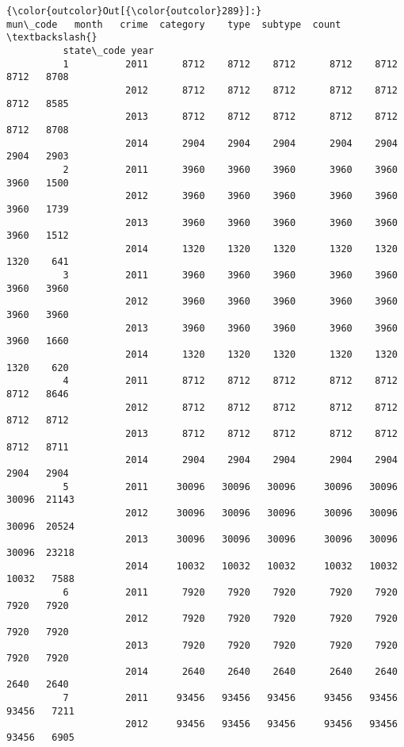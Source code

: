 \documentclass[11pt]{article}
\begin{document}
\begin{Verbatim}[commandchars=\\\{\}]
{\color{outcolor}Out[{\color{outcolor}289}]:}                  mun\_code   month   crime  category    type  subtype  count  \textbackslash{}
          state\_code year                                                               
          1          2011      8712    8712    8712      8712    8712     8712   8708   
                     2012      8712    8712    8712      8712    8712     8712   8585   
                     2013      8712    8712    8712      8712    8712     8712   8708   
                     2014      2904    2904    2904      2904    2904     2904   2903   
          2          2011      3960    3960    3960      3960    3960     3960   1500   
                     2012      3960    3960    3960      3960    3960     3960   1739   
                     2013      3960    3960    3960      3960    3960     3960   1512   
                     2014      1320    1320    1320      1320    1320     1320    641   
          3          2011      3960    3960    3960      3960    3960     3960   3960   
                     2012      3960    3960    3960      3960    3960     3960   3960   
                     2013      3960    3960    3960      3960    3960     3960   1660   
                     2014      1320    1320    1320      1320    1320     1320    620   
          4          2011      8712    8712    8712      8712    8712     8712   8646   
                     2012      8712    8712    8712      8712    8712     8712   8712   
                     2013      8712    8712    8712      8712    8712     8712   8711   
                     2014      2904    2904    2904      2904    2904     2904   2904   
          5          2011     30096   30096   30096     30096   30096    30096  21143   
                     2012     30096   30096   30096     30096   30096    30096  20524   
                     2013     30096   30096   30096     30096   30096    30096  23218   
                     2014     10032   10032   10032     10032   10032    10032   7588   
          6          2011      7920    7920    7920      7920    7920     7920   7920   
                     2012      7920    7920    7920      7920    7920     7920   7920   
                     2013      7920    7920    7920      7920    7920     7920   7920   
                     2014      2640    2640    2640      2640    2640     2640   2640   
          7          2011     93456   93456   93456     93456   93456    93456   7211   
                     2012     93456   93456   93456     93456   93456    93456   6905   

\end{Verbatim}
\end{document}

